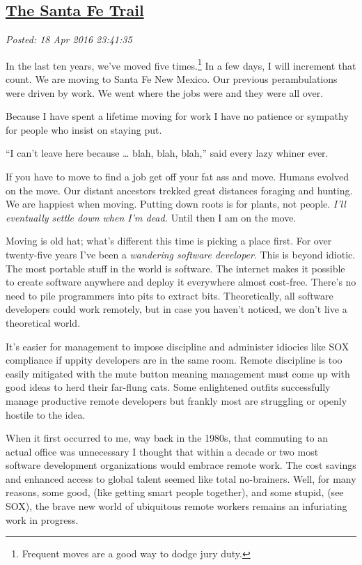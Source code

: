 %

\subsection*{\href{https://bakerjd99.wordpress.com/2016/04/18/the-santa-fe-trail/}{The Santa Fe Trail}}


\noindent\emph{Posted: 18 Apr 2016 23:41:35}
\vspace{6pt}

In the last ten years, we've moved five
times.\footnote{Frequent moves are a good way to dodge jury duty.
}%
In a few days, I will
increment that count. We are moving to Santa Fe New Mexico. Our previous
perambulations were driven by work. We went where the jobs were and they
were all over.

Because I have spent a lifetime moving for work I have no patience or
sympathy for people who insist on staying put.

``I can't leave here because \ldots{} blah, blah, blah,'' said every
lazy whiner ever.

If you have to move to find a job get off your fat ass and move. Humans
evolved on the move. Our distant ancestors trekked great distances
foraging and hunting. We are happiest when moving. Putting down roots is
for plants, not people. \emph{I'll eventually settle down when I'm
dead.} Until then I am on the move.

Moving is old hat; what's different this time is picking a place first.
For over twenty-five years I've been a \emph{wandering software
developer}. This is beyond idiotic. The most portable stuff in the world
is software. The internet makes it possible to create software anywhere
and deploy it everywhere almost cost-free. There's no need to pile
programmers into pits to extract bits. Theoretically, all software
developers could work remotely, but in case you haven't noticed, we
don't live a theoretical world.

It's easier for management to impose discipline and administer idiocies
like SOX compliance if uppity developers are in the same room. Remote
discipline is too easily mitigated with the mute button meaning
management must come up with good ideas to herd their far-flung cats.
Some enlightened outfits successfully manage productive remote
developers but frankly most are struggling or openly hostile to the
idea.

When it first occurred to me, way back in the 1980s, that commuting to
an actual office was unnecessary I thought that within a decade or two
most software development organizations would embrace remote work. The
cost savings and enhanced access to global talent seemed like total
no-brainers. Well, for many reasons, some good, (like getting smart
people together), and some stupid, (see SOX), the brave new world of
ubiquitous remote workers remains an infuriating work in progress.

